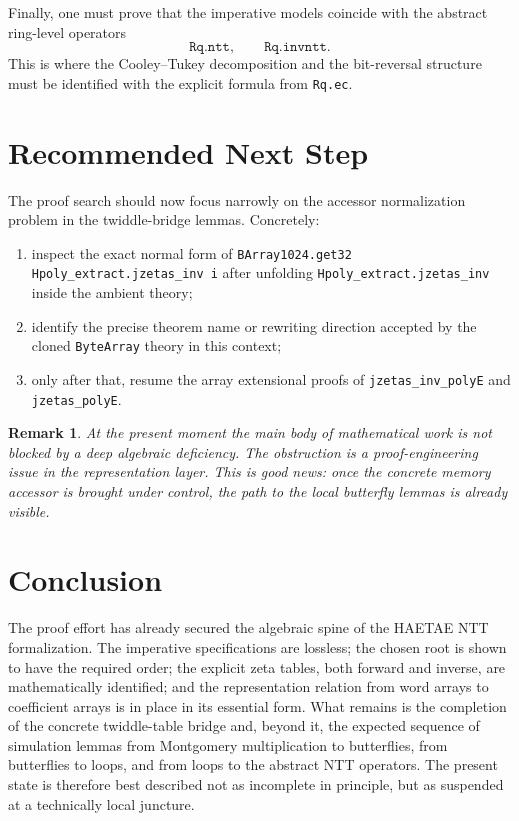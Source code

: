 \documentclass[11pt]{article}
\newtheorem{remark}{Remark}
\begin{document}
Finally, one must prove that the imperative models coincide with the abstract
ring-level operators
\[
\texttt{Rq.ntt}, \qquad \texttt{Rq.invntt}.
\]
This is where the Cooley--Tukey decomposition and the bit-reversal structure
must be identified with the explicit formula from \texttt{Rq.ec}.

\section{Recommended Next Step}

The proof search should now focus narrowly on the accessor normalization
problem in the twiddle-bridge lemmas. Concretely:
\begin{enumerate}
\item inspect the exact normal form of
  \texttt{BArray1024.get32 Hpoly\_extract.jzetas\_inv i}
  after unfolding \texttt{Hpoly\_extract.jzetas\_inv} inside the ambient theory;
\item identify the precise theorem name or rewriting direction accepted by the
  cloned \texttt{ByteArray} theory in this context;
\item only after that, resume the array extensional proofs of
  \texttt{jzetas\_inv\_polyE} and \texttt{jzetas\_polyE}.
\end{enumerate}

\begin{remark}
At the present moment the main body of mathematical work is not blocked by a
deep algebraic deficiency. The obstruction is a proof-engineering issue in the
representation layer. This is good news: once the concrete memory accessor is
brought under control, the path to the local butterfly lemmas is already
visible.
\end{remark}

\section*{Conclusion}

The proof effort has already secured the algebraic spine of the HAETAE NTT
formalization. The imperative specifications are lossless; the chosen root is
shown to have the required order; the explicit zeta tables, both forward and
inverse, are mathematically identified; and the representation relation from
word arrays to coefficient arrays is in place in its essential form. What
remains is the completion of the concrete twiddle-table bridge and, beyond it,
the expected sequence of simulation lemmas from Montgomery multiplication to
butterflies, from butterflies to loops, and from loops to the abstract NTT
operators. The present state is therefore best described not as incomplete in
principle, but as suspended at a technically local juncture.
\end{document}
